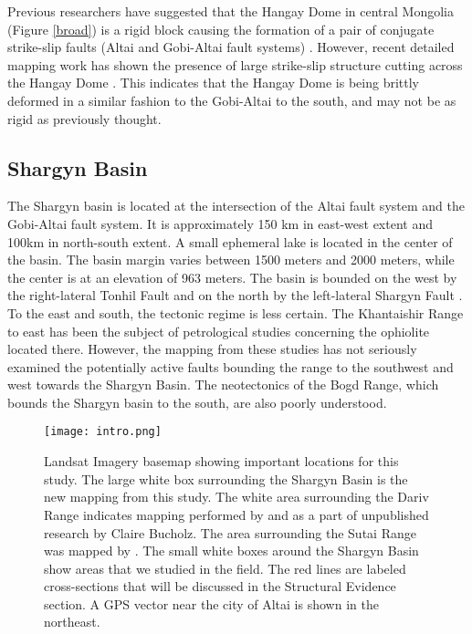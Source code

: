 	Previous researchers have suggested that the Hangay Dome in central Mongolia (Figure \ref{broad}) is a rigid block causing the formation of a pair of conjugate strike-slip faults (Altai and Gobi-Altai fault systems) \citep{Cunningham2005a}. However, recent detailed mapping work has shown the presence of large strike-slip structure cutting across the Hangay Dome \citep{Walker2007}. This indicates that the Hangay Dome is being brittly deformed in a similar fashion to the Gobi-Altai to the south, and may not be as rigid as previously thought\citep{Walker2006}\citep{Walker2007}\citep{Walker2008}.

\subsection{Shargyn Basin}

	The Shargyn basin is located at the intersection of the Altai fault system and the Gobi-Altai fault system. It is approximately 150 km in east-west extent and 100km in north-south extent. A small ephemeral lake is located in the center of the basin. The basin margin varies between 1500 meters and 2000 meters, while the center is at an elevation of 963 meters. The basin is bounded on the west by the right-lateral Tonhil Fault and on the north by the left-lateral Shargyn Fault \citep{Cunningham2003}. To the east and south, the tectonic regime is less certain. The Khantaishir Range to east has been the subject of petrological studies concerning the ophiolite located there. However, the mapping from these studies has not seriously examined the potentially active faults bounding the range to the southwest and west towards the Shargyn Basin.  The neotectonics of the Bogd Range, which bounds the Shargyn basin to the south, are also poorly understood.

\begin{figure}[h!]
	\centering
	\texttt{[image: intro.png]}
	\caption{Landsat Imagery basemap showing important locations for this study. The large white box surrounding the Shargyn Basin is the new mapping from this study. The white area surrounding the Dariv Range indicates mapping performed by \citet{Dijkstra2006} and as a part of unpublished research by Claire Bucholz. The area surrounding the Sutai Range was mapped by \citet{Cunningham2003}. The small white boxes around the Shargyn Basin show areas that we studied in the field. The red lines are labeled cross-sections that will be discussed in the Structural Evidence section. A GPS vector near the city of Altai is shown in the northeast.}
	\label{intro}
\end{figure}
	
